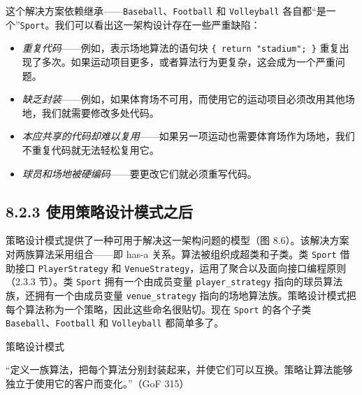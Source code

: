 这个解决方案依赖继承——\texttt{Baseball}、\texttt{Football} 和 \texttt{Volleyball} 各自都“是一个”\texttt{Sport}。我们可以看出这一架构设计存在一些严重缺陷：

\begin{itemize}
\item \emph{重复代码}——例如，表示场地算法的语句块 \texttt{\{\allowbreak{} return "stadium";\allowbreak{} \}\allowbreak{}} 重复出现了多次。如果运动项目更多，或者算法行为更复杂，这会成为一个严重问题。
\item \emph{缺乏封装}——例如，如果体育场不可用，而使用它的运动项目必须改用其他场地，我们就需要修改多处代码。
\item \emph{本应共享的代码却难以复用}——如果另一项运动也需要体育场作为场地，我们不重复代码就无法轻松复用它。
\item \emph{球员和场地被硬编码}——要更改它们就必须重写代码。
\end{itemize}

\subsection{8.2.3 使用策略设计模式之后}

策略设计模式提供了一种可用于解决这一架构问题的模型（图 8.6）。该解决方案对两族算法采用组合——即 has-a 关系。算法被组织成超类和子类。类 \texttt{Sport} 借助接口 \texttt{Player\allowbreak{}Strategy} 和 \texttt{Venue\allowbreak{}Strategy}，运用了聚合以及面向接口编程原则（2.3.3 节）。类 \texttt{Sport} 拥有一个由成员变量 \texttt{player\_\allowbreak{}strategy} 指向的球员算法族，还拥有一个由成员变量 \texttt{venue\_\allowbreak{}strategy} 指向的场地算法族。策略设计模式把每个算法称为一个策略，因此这些命名很贴切。现在 \texttt{Sport} 的各个子类 \texttt{Baseball}、\texttt{Football} 和 \texttt{Volleyball} 都简单多了。

\begin{mySidebar}{策略设计模式}

“定义一族算法，把每个算法分别封装起来，并使它们可以互换。策略让算法能够独立于使用它的客户而变化。”（GoF 315）
\end{mySidebar}


